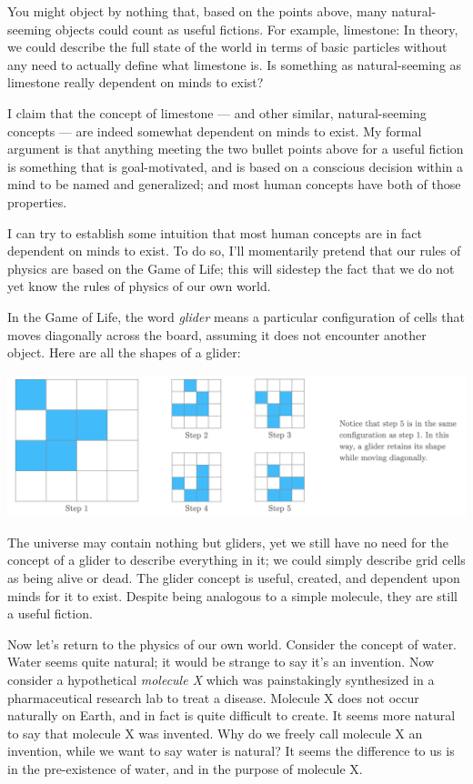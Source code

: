 \documentclass[11pt, oneside]{article}   	%
\begin{document}
You might object by nothing that, based on the points above,
many natural-seeming objects could count as useful fictions.
For example, limestone: In theory, we could describe the full state of the world
in terms of basic particles without any need to actually
define what limestone is. Is something as natural-seeming as limestone really
dependent on minds to exist?

I claim that the concept of limestone --- and other similar, natural-seeming
concepts --- are indeed somewhat dependent on minds to exist.
My formal argument is that anything meeting the two bullet points above for a
useful fiction is something that is goal-motivated, and is based on a conscious
decision within a mind to be named and generalized; and most human concepts have
both of those properties.

I can try to establish some intuition that most human concepts are in fact
dependent on minds to exist. To do so, I'll momentarily pretend that our rules
of physics are based on the Game of Life; this will sidestep the fact that we do
not yet know the rules of physics of our own world.

In the Game of Life, the word {\em glider} means a particular 
configuration of cells that moves diagonally across the board, assuming it does
not encounter another object.
% 
% 
Here are all the shapes of a glider:
\begin{center}
\includegraphics[width=14cm]{glider2.png}
\end{center}
The universe may contain nothing but gliders, yet we still have no need
for the concept of a glider to describe everything in it; we could simply
describe grid cells as being alive or dead.
The glider concept is useful, created, and dependent upon minds for it to
exist. Despite being analogous to a simple molecule, they are still a useful
fiction.

Now let's return to the physics of our own world. Consider the concept of water.
Water seems quite natural;
it would be strange to say it's an invention.
Now consider a hypothetical {\em molecule X} which was painstakingly synthesized
in a pharmaceutical research lab to treat a disease.
Molecule X does not occur naturally on Earth,
and in fact is quite difficult to create. It seems more natural to say that
molecule X was invented.
Why do we freely call molecule X an invention, while we want to say
water is natural?
It seems the difference to us is in the pre-existence of water, and
in the purpose of molecule X.
\end{document}
